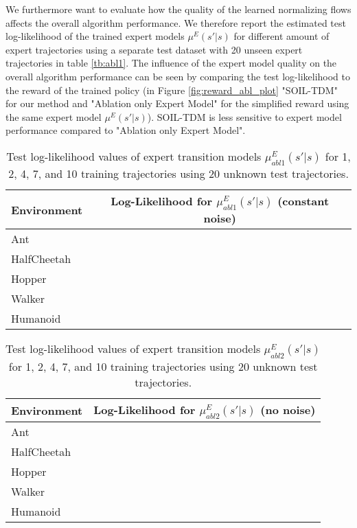 \documentclass{article}
\begin{document}
We furthermore want to evaluate how the quality of the learned normalizing flows affects the overall algorithm performance. We therefore report the estimated test log-likelihood of the trained expert models $\mu^E(s'|s)$ for different amount of expert trajectories using a separate test dataset with 20 unseen expert trajectories in table \ref{tb:abl1}. The influence of the expert model quality on the overall algorithm performance can be seen by comparing the test log-likelihood to the reward of the trained policy (in Figure \ref{fig:reward_abl_plot} "SOIL-TDM" for our method and "Ablation only Expert Model" for the simplified reward using the same expert model $\mu^E(s'|s)$). SOIL-TDM is less sensitive to expert model performance compared to "Ablation only Expert Model".  

\begin{table}
	\renewcommand{\arraystretch}{1.3}
	\centering
	\caption{Test log-likelihood values of expert transition models $\mu_{abl1}^E(s'|s)$ for 1, 2, 4, 7, and 10 training trajectories using 20 unknown test trajectories.}\label{tb:abl2}
	\begin{small}
	\begin{tabular}{l|c}
		Environment & Log-Likelihood for $\mu_{abl1}^E(s'|s)$ (constant noise) \\\hline
		Ant & \makecell{$30.9,30.8,41.1, 41.1,59.0$} \\
		HalfCheetah &  \makecell{$26.3,25.1,78.3, 77.9,79.2$}  \\
		Hopper & \makecell{$-31.6,-26.9,-24.1 ,41.6,40.8$} \\
		Walker & \makecell{$42.1,46.1,55.8,56.8,58.1$} \\
		Humanoid & \makecell{$26.4,38.0,51.5,54.6,57.4$} \\
	\end{tabular}
	\end{small}
\end{table}

\begin{table}
	\renewcommand{\arraystretch}{1.3}
	\centering
	\caption{Test log-likelihood values of expert transition models $\mu_{abl2}^E(s'|s)$ for 1, 2, 4, 7, and 10 training trajectories using 20 unknown test trajectories.}\label{tb:abl3}
	\begin{small}
	\begin{tabular}{l|c}
		Environment & Log-Likelihood for $\mu_{abl2}^E(s'|s)$ (no noise) \\\hline
		Ant & \makecell{$28.7,31.9,37.3, 37.4,38.9$} \\
		HalfCheetah & \makecell{$-inf,-inf,-270.2, -194.2,-187.8$} \\
		Hopper & \makecell{$-171.3,-629.0,-379.1, -87.1,-70.9$} \\
		Walker & \makecell{$-inf,-inf,-389.0, -182.4,-180.1$} \\
		Humanoid & \makecell{$25.9,36.7,46.4,50.1,52.1$}\\
	\end{tabular}
	\end{small}
\end{table}
\end{document}
